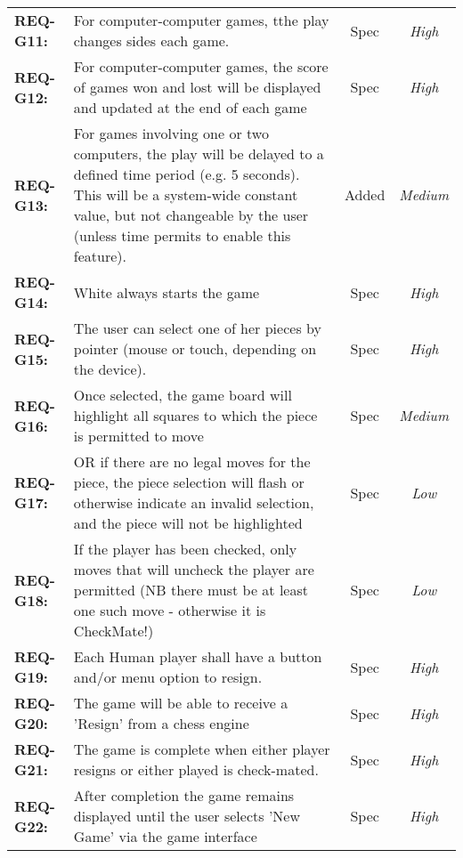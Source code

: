 \documentclass[a4paper,10pt]{article}
\begin{document}
\begin{table}[H]
\begin{tabular}{|| l | p{10.5cm}  |  c  | c ||}
\textbf{REQ-G11:} 
& For computer-computer games, tthe play changes sides each game.
& Spec  &  \textit{High}\\

\textbf{REQ-G12:} 
& For computer-computer games, the score of games won and lost will be displayed and updated at the end of each game
& Spec  &  \textit{High}\\

\textbf{REQ-G13:} 
& For games involving one or two computers, the play will be delayed to a defined time period (e.g. 5 seconds). This will be a system-wide constant value, but not changeable by the user (unless time permits to enable this feature). 
& Added  &  \textit{Medium}\\

\textbf{REQ-G14:} 
&  White always starts the game
& Spec  &  \textit{High}\\

\textbf{REQ-G15:} 
& The user can select one of her pieces by pointer (mouse or touch, depending on the device). 
& Spec  &  \textit{High}\\

\textbf{REQ-G16:} 
& Once selected, the game board will highlight all squares to which the piece is permitted to move
& Spec  &  \textit{Medium}\\

\textbf{REQ-G17:} 
& OR if there are no legal moves for the piece, the piece selection will flash or otherwise indicate an invalid selection, and the piece will not be highlighted
& Spec  &  \textit{Low}\\

\textbf{REQ-G18:} 
&  If the player has been checked, only moves that will uncheck the player are permitted (NB there must be at least one such move - otherwise it is CheckMate!)
& Spec  &  \textit{Low}\\

\textbf{REQ-G19:} 
&  Each Human player shall have a button and/or menu option to resign.
& Spec  &  \textit{High}\\

\textbf{REQ-G20:} 
&  The game will be able to receive a 'Resign' from a chess engine
& Spec  &  \textit{High}\\

\textbf{REQ-G21:} 
&  The game is complete when either player resigns or either played is check-mated.
& Spec  &  \textit{High}\\


\textbf{REQ-G22:} 
&  After completion the game remains displayed until the user selects 'New Game' via the game interface
& Spec  &  \textit{High}\\



\hline
\end{tabular}
\end{table}
\end{document}
